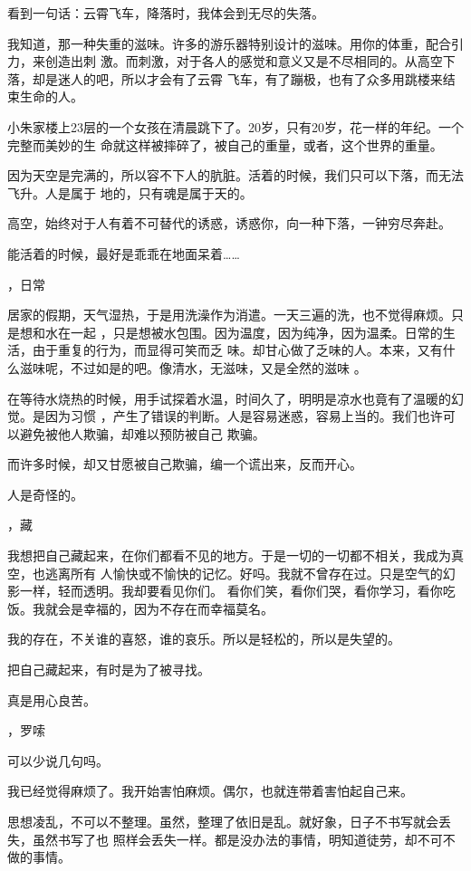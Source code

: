 \documentclass[12pt,a4paper]{article}
\newcommand{\subpart}[1]{
	\begingroup \par
	\vspace{1ex} \centering #1
	\par \endgroup
}
\begin{document}
		看到一句话：云霄飞车，降落时，我体会到无尽的失落。

		我知道，那一种失重的滋味。许多的游乐器特别设计的滋味。用你的体重，配合引力，来创造出刺
	激。而刺激，对于各人的感觉和意义又是不尽相同的。从高空下落，却是迷人的吧，所以才会有了云霄
	飞车，有了蹦极，也有了众多用跳楼来结束生命的人。

		小朱家楼上23层的一个女孩在清晨跳下了。20岁，只有20岁，花一样的年纪。一个完整而美妙的生
	命就这样被摔碎了，被自己的重量，或者，这个世界的重量。

		因为天空是完满的，所以容不下人的肮脏。活着的时候，我们只可以下落，而无法飞升。人是属于
	地的，只有魂是属于天的。

		高空，始终对于人有着不可替代的诱惑，诱惑你，向一种下落，一钟穷尽奔赴。

		能活着的时候，最好是乖乖在地面呆着……


		\subpart{6，日常}

		居家的假期，天气湿热，于是用洗澡作为消遣。一天三遍的洗，也不觉得麻烦。只是想和水在一起
	，只是想被水包围。因为温度，因为纯净，因为温柔。日常的生活，由于重复的行为，而显得可笑而乏
	味。却甘心做了乏味的人。本来，又有什么滋味呢，不过如是的吧。像清水，无滋味，又是全然的滋味
	。

		在等待水烧热的时候，用手试探着水温，时间久了，明明是凉水也竟有了温暖的幻觉。是因为习惯
	，产生了错误的判断。人是容易迷惑，容易上当的。我们也许可以避免被他人欺骗，却难以预防被自己
	欺骗。

		而许多时候，却又甘愿被自己欺骗，编一个谎出来，反而开心。

		人是奇怪的。


		\subpart{7，藏}

		我想把自己藏起来，在你们都看不见的地方。于是一切的一切都不相关，我成为真空，也逃离所有
	人愉快或不愉快的记忆。好吗。我就不曾存在过。只是空气的幻影一样，轻而透明。我却要看见你们。
	看你们笑，看你们哭，看你学习，看你吃饭。我就会是幸福的，因为不存在而幸福莫名。

		我的存在，不关谁的喜怒，谁的哀乐。所以是轻松的，所以是失望的。

		把自己藏起来，有时是为了被寻找。

		真是用心良苦。


		\subpart{8，罗嗦}

		可以少说几句吗。

		我已经觉得麻烦了。我开始害怕麻烦。偶尔，也就连带着害怕起自己来。

		思想凌乱，不可以不整理。虽然，整理了依旧是乱。就好象，日子不书写就会丢失，虽然书写了也
	照样会丢失一样。都是没办法的事情，明知道徒劳，却不可不做的事情。
\end{document}

